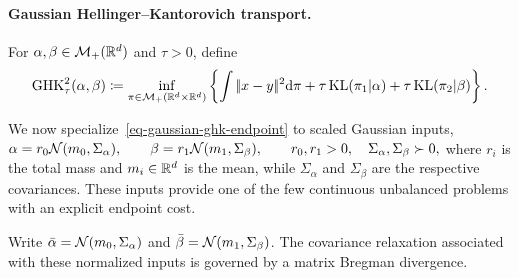 \paragraph{Gaussian Hellinger--Kantorovich transport.}
\begin{defn}\label{def-gaussian-ghk}
For $\alpha,\beta\in\mathcal{M}_+(\mathbb{R}^d)$ and $\tau>0$, define
\begin{equation}\label{eq-gaussian-ghk-endpoint}
\operatorname{GHK}_\tau^2(\alpha,\beta)
\coloneqq
\inf_{\pi\in\mathcal{M}_+(\mathbb{R}^d\times\mathbb{R}^d)}
\left\{
\int|\!| x-y |\!|^2\mathrm{d}\pi
+\tau\operatorname{KL}(\pi_1|\alpha)
+\tau\operatorname{KL}(\pi_2|\beta)
\right\}.
\end{equation}
\end{defn}
We now specialize~\eqref{eq-gaussian-ghk-endpoint} to scaled Gaussian inputs, \(\alpha=r_0\mathcal{N}(m_0,\Sigma_\alpha), \qquad \beta=r_1\mathcal{N}(m_1,\Sigma_\beta), \qquad r_0,r_1>0,\quad \Sigma_\alpha,\Sigma_\beta\succ0,\)
where $r_i$ is the total mass and $m_i\in\mathbb{R}^d$ is the mean, while $\Sigma_\alpha$ and $\Sigma_\beta$ are the respective covariances. These inputs provide one of the few continuous unbalanced problems with an explicit endpoint cost.

Write $\bar\alpha=\mathcal{N}(m_0,\Sigma_\alpha)$ and $\bar\beta=\mathcal{N}(m_1,\Sigma_\beta)$. The covariance relaxation associated with these normalized inputs is governed by a matrix Bregman divergence.

